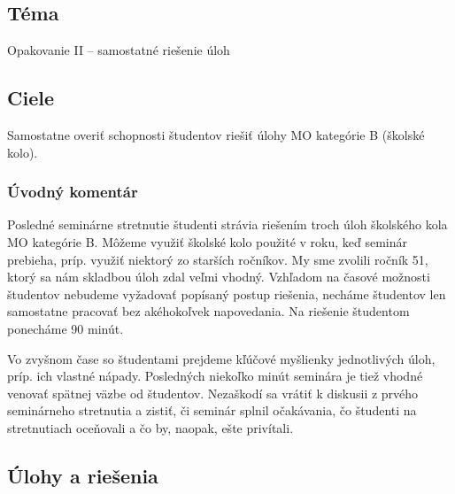 
\subsection*{Téma}
Opakovanie II -- samostatné riešenie úloh

\subsection*{Ciele}
Samostatne overiť schopnosti študentov riešiť úlohy MO kategórie B (školské kolo).

\subsubsection*{Úvodný komentár}

Posledné seminárne stretnutie študenti strávia riešením troch úloh školského kola MO kategórie B. Môžeme využiť školské kolo použité v roku, keď seminár prebieha, príp. využiť niektorý zo starších ročníkov. My sme zvolili ročník 51, ktorý sa nám skladbou úloh zdal veľmi vhodný. Vzhľadom na časové možnosti študentov nebudeme vyžadovať popísaný postup riešenia, necháme študentov len samostatne pracovať bez akéhokoľvek napovedania. Na riešenie študentom ponecháme 90 minút. 

Vo zvyšnom čase so študentami prejdeme kľúčové myšlienky jednotlivých úloh, príp. ich vlastné nápady. Posledných niekoľko minút seminára je tiež vhodné venovať spätnej väzbe od študentov. Nezaškodí sa vrátiť k diskusii z prvého seminárneho stretnutia a zistiť, či seminár splnil očakávania, čo študenti na stretnutiach oceňovali a čo by, naopak, ešte privítali.


\subsection*{Úlohy a riešenia}

